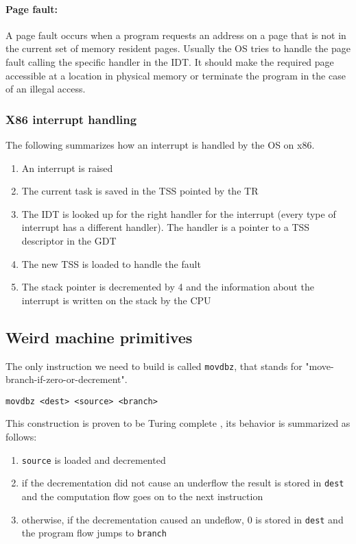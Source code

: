 \documentclass[11pt,twoside,a4paper]{article}
\begin{document}
\paragraph{Page fault: } A page fault occurs when a program requests an address on a page that is not in the current set of memory resident pages. Usually the OS tries to handle the page fault calling the specific handler in the IDT. It should make the required page accessible at a location in physical memory or terminate the program in the case of an illegal access.


\subsubsection{X86 interrupt handling}

The following summarizes how an interrupt is handled by the OS on x86.

\begin{enumerate}
\item An interrupt is raised
\item The current task is saved in the TSS pointed by the TR
\item The IDT is looked up for the right handler for the interrupt (every type of interrupt has a different handler). The handler is a pointer to a TSS descriptor in the GDT
\item The new TSS is loaded to handle the fault
\item The stack pointer is decremented by 4 and the information about the interrupt is written on the stack by the CPU
\end{enumerate}

\subsection{Weird machine primitives}

The only instruction we need to build is called \texttt{movdbz}, that stands for "move-branch-if-zero-or-decrement".

\texttt{movdbz <dest> <source> <branch>}

This construction is proven to be Turing complete \cite{mmu_machine}, its behavior is summarized as follows:
\begin{enumerate}
\item \texttt{source} is loaded and decremented
\item if the decrementation did not cause an underflow the result is stored in \texttt{dest} and the computation flow goes on to the next instruction
\item otherwise, if the decrementation caused an undeflow, 0 is stored in \texttt{dest} and the program flow jumps to \texttt{branch}
\end{enumerate}
\end{document}
